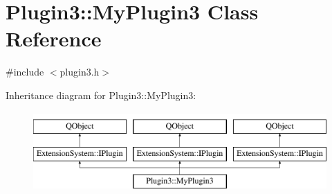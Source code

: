 \hypertarget{class_plugin3_1_1_my_plugin3}{\section{Plugin3\-:\-:My\-Plugin3 Class Reference}
\label{class_plugin3_1_1_my_plugin3}
}


{\ttfamily \#include $<$plugin3.\-h$>$}

Inheritance diagram for Plugin3\-:\-:My\-Plugin3\-:\begin{figure}[H]
\begin{center}
\leavevmode
\includegraphics[height=3.000000cm]{class_plugin3_1_1_my_plugin3}
\end{center}
\end{figure}

